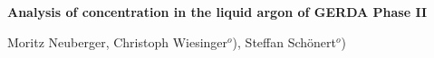 \documentclass[encoding=utf8,british]{tumphthesis}
\newcommand{\titleheader}{Analysis of \Kr concentration in the liquid argon of GERDA Phase II} %
\begin{document}
\begin{titlepage}
\vspace*{20mm}
\begin{center}
{\Large\textbf{\titleheader}}
\vspace*{10mm}

Moritz Neuberger, Christoph Wiesinger$^o$), Steffan Schönert$^o$)
\vspace*{5mm}


\end{center}
\end{titlepage}
\end{document}
